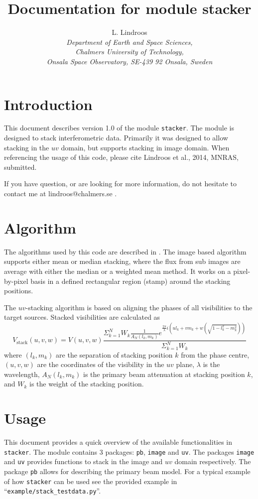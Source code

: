 \documentclass{article}
\title{Documentation for module stacker}
\author{L. Lindroos\\
{\it Department of Earth and Space Sciences,}\\
{\it Chalmers University of Technology,}\\
{\it Onsala Space Observatory,
SE-439 92 Onsala,
Sweden}
}
\begin{document}
\maketitle

\section{Introduction}
This document describes version 1.0 of the module {\tt stacker}.
The module is designed to stack interferometric data.
Primarily it was designed to allow stacking in the $uv$ domain, 
but supports stacking in image domain.
When referencing the usage of this code, please cite Lindroos et al., 2014, MNRAS, submitted.

If you have question, or are looking for more information, 
do not hesitate to contact me at lindroos@chalmers.se .

\section{Algorithm}
The algorithms used by this code are described in \cite{lindroos2014}.
The image based algorithm supports either mean or median stacking,
where the flux from sub images are average with either the median or a weighted mean method.
It works on a pixel-by-pixel basis in a defined rectangular region (stamp) around the stacking positions.

The $uv$-stacking algorithm is based on aligning the phases of all visibilities to the target sources.
Stacked visibilities are calculated as 
\begin{equation}
	V_\mathrm{stack}(u,v,w) = V(u,v,w) \frac{\Sigma_{k=1}^N W_k \frac{1}{A_N(l_k, m_k)} e^{\frac{2\pi}{\lambda} i \left( u l_k + v m_k + w(\sqrt{1-l_k^2-m_k^2})\right)} 
	}{\Sigma_{k=1}^N W_k}
	\label{eq:uvstack}
\end{equation}
where $(l_k, m_k)$ are the separation of stacking position $k$ from the phase centre,
$(u,v,w)$ are the coordinates of the visibility in the $uv$ plane,
$\lambda$ is the wavelength, 
$A_N(l_k, m_k)$ is the primary beam attenuation at stacking position $k$,
and $W_k$ is the weight of the stacking position.

\section{Usage}
This document provides a quick overview of the available functionalities in {\tt stacker}.
The module contains 3 packages: {\tt pb}, {\tt image} and {\tt uv}.
The packages {\tt image} and {\tt uv} provides functions to stack in the image and $uv$ domain respectively.
The package {\tt pb} allows for describing the primary beam model.
For a typical example of how {\tt stacker} can be used see the provided example in ``{\tt example/stack\_testdata.py}''.
\end{document}
